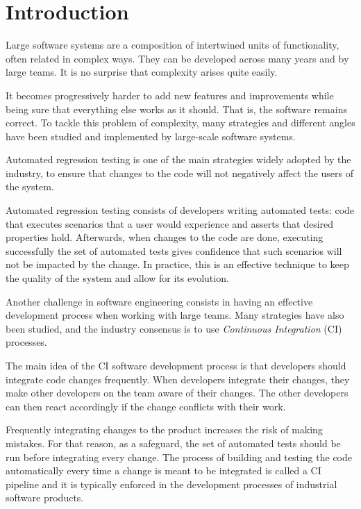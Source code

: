 \chapter{Introduction}

Large software systems are a composition of intertwined units of functionality,
often related in complex ways. They can be developed across many years and by 
large teams. It is no surprise that complexity arises quite easily. 

It becomes progressively harder to add new features and improvements while being 
sure that everything else works as it should. That is, the software remains
correct. To tackle this problem of complexity, many strategies and different 
angles have been studied and implemented by large-scale software systems. 

Automated regression testing is one of the main strategies widely adopted by the industry,
to ensure that changes to the code will not negatively affect the users of the system. 

Automated regression testing consists of developers writing automated tests: code that executes scenarios that a user would experience
and asserts that desired properties hold. Afterwards, when changes to the code are done,
executing successfully the set of automated tests gives confidence that such scenarios will
not be impacted by the change. In practice, this is an effective technique to keep the quality of the system and
allow for its evolution. 

Another challenge in software engineering consists in having an effective development process when
working with large teams. Many strategies have also been studied, and the industry 
consensus is to use \emph{Continuous Integration} (CI) processes.

The main idea of the CI software development process is that developers should
integrate code changes frequently. When developers integrate their changes,
they make other developers on the team aware of their changes. The other developers
can then react accordingly if the change conflicts with their work.

Frequently integrating changes to the product increases the risk of making mistakes.
For that reason, as a safeguard, the set of automated tests should be run before 
integrating every change. The process of building and testing the code automatically
every time a change is meant to be integrated is called a CI pipeline and it is typically
enforced in the development processes of industrial software products.


